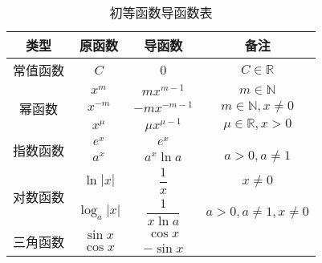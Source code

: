 \begin{table}
    \centering
    \caption{初等函数导函数表}
    \renewcommand\arraystretch{1.8}
    \begin{tabular}{|c|c|c|c|}
        \hline
        类型                        & 原函数                                              & 导函数                       & 备注                                           \\
        \hline
        常值函数                    & $C$                                                 & $0$                          & $C\in \mathbb{R}$                              \\
        \hline
        \multirow{3}{*}{幂函数}     & $x^m$                                               & $mx^{m - 1}$                 & $m \in \mathbb{N}$                             \\
                                    & $x^{-m}$                                            & $-mx^{-m - 1}$               & $m \in \mathbb{N},x \ne 0$                     \\
                                    & $x^\mu$                                             & $\mu x^{\mu - 1}$            & $\mu \in \mathbb{R}, x > 0$                    \\
        \hline
        \multirow{2}{*}{指数函数}   & $e^x$                                               & $e^x$                        &                                                \\
                                    & $a^x$                                               & $a^x\ln a$                   & $a > 0, a \ne 1$                               \\
        \hline
        \multirow{2}{*}{对数函数}   & $\ln |x|$                                           & $\dfrac{1}{x}$               & $x \ne 0$                                      \\[8pt]
                                    & $\log_a|x|$                                         & $\dfrac{1}{x\ln a}$          & $a > 0, a \ne 1, x \ne 0$                      \\[5pt]
        \hline
        \multirow{4}{*}{三角函数}   & $\sin x$                                            & $\cos x$                     &                                                \\
                                    & $\cos x$                                            & $-\sin x$                    &                                                \\

\end{tabular}
\end{table}
